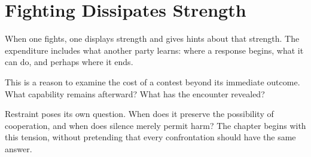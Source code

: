 \chapter{Fighting Dissipates Strength}
\label{short:fighting-dissipates-strength}

When one fights, one displays strength and gives hints about that strength.
The expenditure includes what another party learns: where a response begins,
what it can do, and perhaps where it ends.

This is a reason to examine the cost of a contest beyond its immediate
outcome. What capability remains afterward? What has the encounter revealed?

Restraint poses its own question. When does it preserve the possibility of
cooperation, and when does silence merely permit harm? The chapter begins
with this tension, without pretending that every confrontation should have
the same answer.

